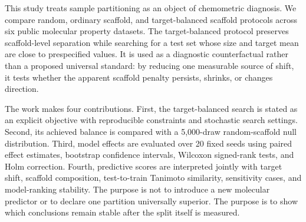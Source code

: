 This study treats sample partitioning as an object of chemometric diagnosis. We compare random, ordinary scaffold, and target-balanced scaffold protocols across six public molecular property datasets. The target-balanced protocol preserves scaffold-level separation while searching for a test set whose size and target mean are close to prespecified values. It is used as a diagnostic counterfactual rather than a proposed universal standard: by reducing one measurable source of shift, it tests whether the apparent scaffold penalty persists, shrinks, or changes direction.

The work makes four contributions. First, the target-balanced search is stated as an explicit objective with reproducible constraints and stochastic search settings. Second, its achieved balance is compared with a 5,000-draw random-scaffold null distribution. Third, model effects are evaluated over 20 fixed seeds using paired effect estimates, bootstrap confidence intervals, Wilcoxon signed-rank tests, and Holm correction. Fourth, predictive scores are interpreted jointly with target shift, scaffold composition, test-to-train Tanimoto similarity, sensitivity cases, and model-ranking stability. The purpose is not to introduce a new molecular predictor or to declare one partition universally superior. The purpose is to show which conclusions remain stable after the split itself is measured.

